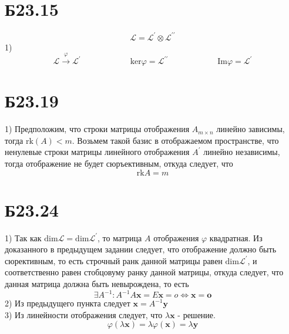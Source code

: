 \documentclass[a4paper,12pt]{article} %
\begin{document}
\section*{Б23.15}$$\mathcal{L}=\mathcal{L}^{\prime}\otimes\mathcal{L}^{\prime\prime}$$1)
$$\mathcal{L}\overset{\varphi}{\to}\mathcal{L}^{\prime}\qquad\qquad\qquad\mathrm{ker}\varphi=\mathcal{L}^{\prime\prime}\qquad\qquad\qquad\mathrm{Im}\varphi=\mathcal{L}^{\prime}$$
\section*{Б23.19}1)
Предположим, что строки матрицы отображения $A_{m\times n}$ линейно зависимы, тогда $\mathrm{rk}(A)<m$. Возьмем такой базис в отображаемом пространстве, что ненулевые строки матрицы линейного отображения $A^{\prime}$ линейно независимы, тогда отображение не будет сюръективным, откуда следует, что $$\mathrm{rk}A=m$$
\section*{Б23.24}
1) Так как $\mathrm{dim}\mathcal{L}=\mathrm{dim}\mathcal{L}^{\prime}$, то матрица $A$ отображения $\varphi$ квадратная. Из доказанного в предыдущем задании следует, что отображение должно быть сюрективным, то есть строчный ранк данной матрицы равен $\mathrm{dim}\mathcal{L}^{\prime}$, и соответственно равен стобцовуму ранку данной матрицы, откуда следует, что данная матрица должна быть невырождена, то есть $$\exists A^{-1}:A^{-1}A\textbf{x}=E\textbf{x}=o\Leftrightarrow \textbf{x}=\textbf{o}$$
2) Из предыдущего пункта следует $\textbf{x}=A^{-1}\textbf{y}$\\
3) Из линейности отображения следует, что $\lambda \textbf{x}$ - решение.$$\varphi(\lambda\textbf{x})=\lambda\varphi(\textbf{x})=\lambda \textbf{y}$$
\end{document}
